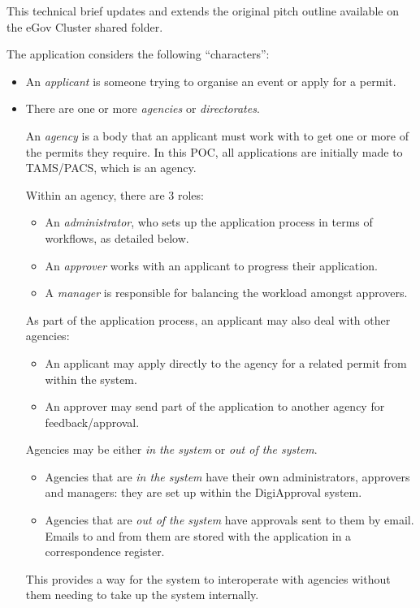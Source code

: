 \documentclass[12pt,a4paper,twosided]{article}
\begin{document}
This technical brief updates and extends the original pitch outline
available on the eGov Cluster shared folder.

The application considers the following ``characters'':

\begin{itemize}
\item
  An \emph{applicant} is someone trying to organise an event or apply
  for a permit.
\item
  There are one or more \emph{agencies} or \emph{directorates}.

  An \emph{agency} is a body that an applicant must work with to get one
  or more of the permits they require. In this POC, all applications are
  initially made to TAMS/PACS, which is an agency.

  Within an agency, there are 3 roles:

  \begin{itemize}
  \itemsep1pt\parskip0pt
  \item
    An \emph{administrator}, who sets up the application process in
    terms of workflows, as detailed below.
  \item
    An \emph{approver} works with an applicant to progress their
    application.
  \item
    A \emph{manager} is responsible for balancing the workload amongst
    approvers.
  \end{itemize}

  As part of the application process, an applicant may also deal with
  other agencies:

  \begin{itemize}
  \itemsep1pt\parskip0pt
  \item
    An applicant may apply directly to the agency for a related permit
    from within the system.
  \item
    An approver may send part of the application to another agency for
    feedback/approval.
  \end{itemize}

  Agencies may be either \emph{in the system} or \emph{out of the
  system}.

  \begin{itemize}
  \itemsep1pt\parskip0pt
  \item
    Agencies that are \emph{in the system} have their own
    administrators, approvers and managers: they are set up within the
    DigiApproval system.
  \item
    Agencies that are \emph{out of the system} have approvals sent to
    them by email. Emails to and from them are stored with the
    application in a correspondence register.
  \end{itemize}

  This provides a way for the system to interoperate with agencies
  without them needing to take up the system internally.
\end{itemize}
\end{document}
